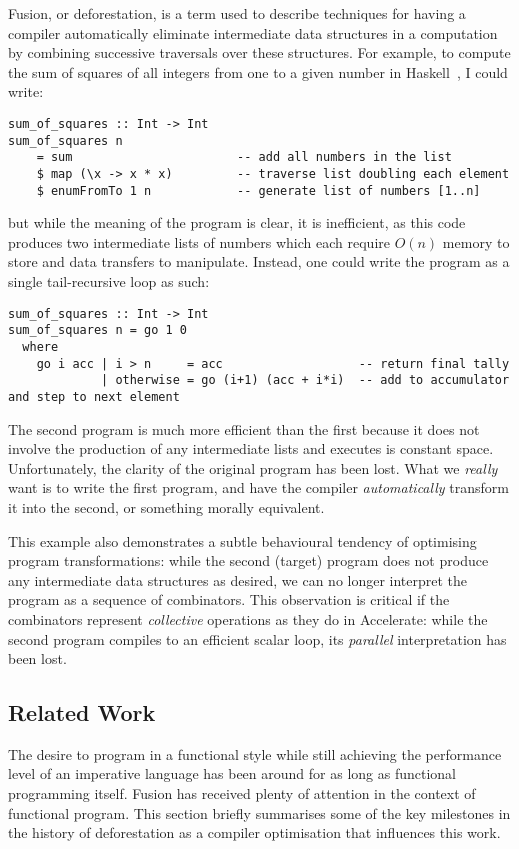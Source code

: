 Fusion, or deforestation, is a term used to describe techniques for having a
compiler automatically eliminate intermediate data structures in a computation
by combining successive traversals over these structures. For example, to
compute the sum of squares of all integers from one to a given number in
Haskell~\cite{Haskell:1998}, I could write:
%
\begin{lstlisting}[style=haskell]
sum_of_squares :: Int -> Int
sum_of_squares n
    = sum                       -- add all numbers in the list
    $ map (\x -> x * x)         -- traverse list doubling each element
    $ enumFromTo 1 n            -- generate list of numbers [1..n]
\end{lstlisting}
%
but while the meaning of the program is clear, it is inefficient, as this code
produces two intermediate lists of numbers which each require $O(n)$ memory to
store and data transfers to manipulate. Instead, one could write the program
as a single tail-recursive loop as such:
%
\begin{lstlisting}[style=haskell]
sum_of_squares :: Int -> Int
sum_of_squares n = go 1 0
  where
    go i acc | i > n     = acc                   -- return final tally
             | otherwise = go (i+1) (acc + i*i)  -- add to accumulator and step to next element
\end{lstlisting}
%
The second program is much more efficient than the first because it does not
involve the production of any intermediate lists and executes is constant space.
Unfortunately, the clarity of the original program has been lost. What we
\emph{really} want is to write the first program, and have the compiler
\emph{automatically} transform it into the second, or something morally
equivalent.

This example also demonstrates a subtle behavioural tendency of optimising
program transformations: while the second (target) program does not produce any
intermediate data structures as desired, we can no longer interpret the program
as a sequence of combinators. This observation is critical if the combinators
represent \emph{collective} operations as they do in Accelerate: while the
second program compiles to an efficient scalar loop, its \emph{parallel}
interpretation has been lost.


\subsection{Related Work}

The desire to program in a functional style while still achieving the
performance level of an imperative language has been around for as long as
functional programming itself. Fusion has received plenty of attention in the
context of functional program. This section briefly summarises some of the key
milestones in the history of deforestation as a compiler optimisation that
influences this work.


